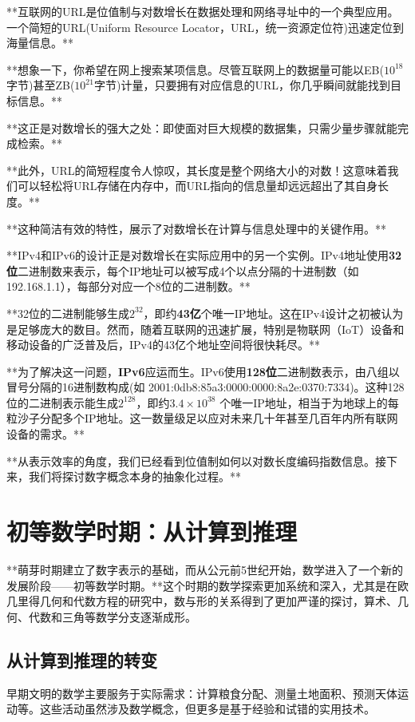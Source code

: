 **互联网的URL是位值制与对数增长在数据处理和网络寻址中的一个典型应用。一个简短的URL(Uniform Resource Locator，URL，统一资源定位符)迅速定位到海量信息。**

**想象一下，你希望在网上搜索某项信息。尽管互联网上的数据量可能以EB($10^{18}$字节)甚至ZB($10^{21}$字节)计量，只要拥有对应信息的URL，你几乎瞬间就能找到目标信息。**

**这正是对数增长的强大之处：即使面对巨大规模的数据集，只需少量步骤就能完成检索。**

**此外，URL的简短程度令人惊叹，其长度是整个网络大小的对数！这意味着我们可以轻松将URL存储在内存中，而URL指向的信息量却远远超出了其自身长度。**

**这种简洁有效的特性，展示了对数增长在计算与信息处理中的关键作用。**

**IPv4和IPv6的设计正是对数增长在实际应用中的另一个实例。IPv4地址使用{\bf 32位}二进制数来表示，每个IP地址可以被写成4个以点分隔的十进制数（如192.168.1.1），每部分对应一个8位的二进制数。**

**32位的二进制能够生成$2^{32}$，即约{\bf 43亿}个唯一IP地址。这在IPv4设计之初被认为是足够庞大的数目。然而，随着互联网的迅速扩展，特别是物联网（IoT）设备和移动设备的广泛普及后，IPv4的43亿个地址空间将很快耗尽。**

**为了解决这一问题，{\bf IPv6}应运而生。IPv6使用{\bf 128位}二进制数表示，由八组以冒号分隔的16进制数构成(如 2001:0db8:85a3:0000:0000:8a2e:0370:7334)。这种128位的二进制表示能生成$2^{128}$，即约{\bf $3.4 \times 10^{38} $} 个唯一IP地址，相当于为地球上的每粒沙子分配多个IP地址。这一数量级足以应对未来几十年甚至几百年内所有联网设备的需求。**

**从表示效率的角度，我们已经看到位值制如何以对数长度编码指数信息。接下来，我们将探讨数字概念本身的抽象化过程。**

\section{初等数学时期：从计算到推理}

**萌芽时期建立了数字表示的基础，而从公元前5世纪开始，数学进入了一个新的发展阶段——初等数学时期。**这个时期的数学探索更加系统和深入，尤其是在欧几里得几何和代数方程的研究中，数与形的关系得到了更加严谨的探讨，算术、几何、代数和三角等数学分支逐渐成形。

\subsection{从计算到推理的转变}

早期文明的数学主要服务于实际需求：计算粮食分配、测量土地面积、预测天体运动等。这些活动虽然涉及数学概念，但更多是基于经验和试错的实用技术。

